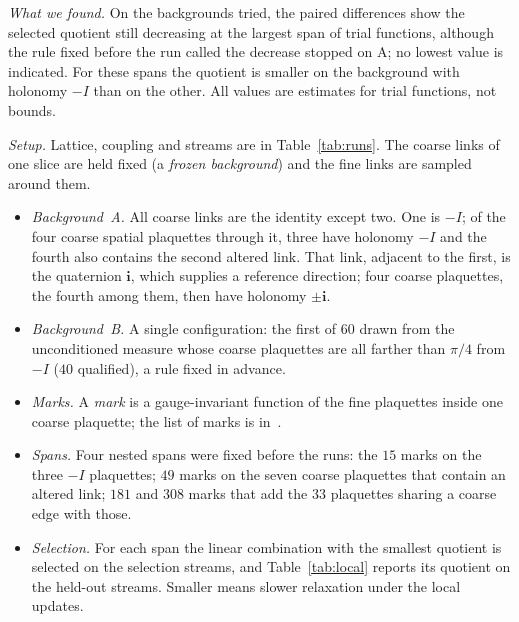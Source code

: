 \emph{What we found.} On the backgrounds tried, the paired differences show the selected quotient still
decreasing at the largest span of trial functions, although the rule fixed before the run called the decrease
stopped on A; no lowest value is indicated. For these spans the quotient is smaller on the background with
holonomy $-I$ than on the other. All values are estimates for trial functions, not bounds.

\emph{Setup.} Lattice, coupling and streams are in Table~\ref{tab:runs}. The coarse links of one slice are
held fixed (a \emph{frozen background}) and the fine links are sampled around them.
\begin{itemize}
\item \emph{Background~A.} All coarse links are the identity except two. One is $-I$; of the four coarse
spatial plaquettes through it, three have holonomy $-I$ and the fourth also contains the second altered link.
That link, adjacent to the first, is the quaternion $\mathbf i$, which supplies a reference direction; four
coarse plaquettes, the fourth among them, then have holonomy $\pm\mathbf i$.
\item \emph{Background~B.} A single configuration: the first of $60$ drawn from the unconditioned measure
whose coarse plaquettes are all farther than $\pi/4$ from $-I$ ($40$ qualified), a rule fixed in advance.
\item \emph{Marks.} A \emph{mark} is a gauge-invariant function of the fine plaquettes inside one coarse
plaquette; the list of marks is in~\cite{RepoData}.
\item \emph{Spans.} Four nested spans were fixed before the runs: the $15$ marks on the three $-I$
plaquettes; $49$ marks on the seven coarse plaquettes that contain an altered link; $181$ and $308$ marks
that add the $33$ plaquettes sharing a coarse edge with those.
\item \emph{Selection.} For each span the linear combination with the smallest quotient is selected on the
selection streams, and Table~\ref{tab:local} reports its quotient on the held-out streams. Smaller means
slower relaxation under the local updates.
\end{itemize}

